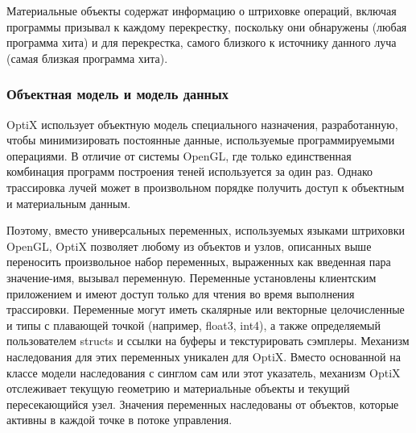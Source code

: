 Материальные объекты содержат информацию о штриховке операций, включая программы призывал к каждому перекрестку, поскольку они обнаружены (любая программа хита) и для перекрестка, самого близкого к источнику данного луча (самая близкая программа хита).

\subsubsection {Объектная модель и модель данных}
OptiX использует объектную модель специального назначения, разработанную, чтобы минимизировать постоянные данные, используемые программируемыми операциями. В отличие от системы OpenGL, где только единственная комбинация программ построения теней используется за один раз. Однако трассировка лучей может в произвольном порядке получить доступ к объектным и материальным данным. 

Поэтому, вместо универсальных переменных, используемых языками штриховки OpenGL, OptiX позволяет любому из объектов и узлов, описанных выше переносить произвольное набор переменных, выраженных как введенная пара значение-имя, вызывал переменную. Переменные установлены клиентским приложением и имеют доступ только для чтения во время выполнения трассировки. Переменные могут иметь скалярные или векторные целочисленные и типы с плавающей точкой (например, float3, int4), а также определяемый пользователем structs и ссылки на буферы и текстурировать сэмплеры. Механизм наследования для этих переменных уникален для OptiX. Вместо основанной на классе модели наследования с синглом сам или этот указатель, механизм OptiX отслеживает текущую геометрию и материальные объекты и текущий пересекающийся узел. Значения переменных наследованы от объектов, которые активны в каждой точке в потоке управления.

